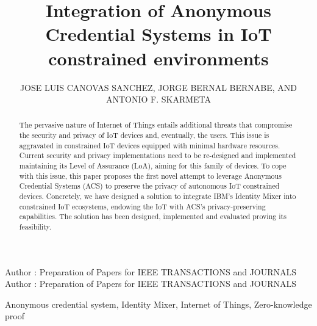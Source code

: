 \documentclass{ieeeaccess}
\begin{document}

\title{Integration of Anonymous Credential Systems in IoT constrained environments}
\author{\uppercase{Jose Luis Canovas Sanchez},
\uppercase{Jorge Bernal Bernabe, and Antonio F. Skarmeta}
}
\address{Department of Information and Communications Engineering\\
	Computer Science Faculty, 
	University of Murcia, Spain\\
	\{joseluiscanovas, jorgebernal, skarmeta\}@um.es\\
}

\markboth
{Author \headeretal: Preparation of Papers for IEEE TRANSACTIONS and JOURNALS}
{Author \headeretal: Preparation of Papers for IEEE TRANSACTIONS and JOURNALS}


\begin{abstract}
The pervasive nature of Internet of Things entails additional threats that compromise the security and privacy of IoT devices and, eventually, the users. This issue is aggravated in constrained IoT devices equipped with minimal hardware resources. Current security and privacy implementations need to be re-designed and implemented maintaining its Level of Assurance (LoA), aiming for this family of devices. To cope with this issue, this paper proposes the first novel attempt to leverage Anonymous Credential Systems (ACS) to preserve the privacy of autonomous IoT constrained devices. Concretely, we have designed a solution to integrate IBM's Identity Mixer into constrained IoT ecosystems, endowing the IoT with ACS's privacy-preserving capabilities. The solution has been designed, implemented and evaluated proving its feasibility.
\end{abstract}

\begin{keywords}
Anonymous credential system, Identity Mixer, Internet of Things, Zero-knowledge proof
\end{keywords}
\end{document}
